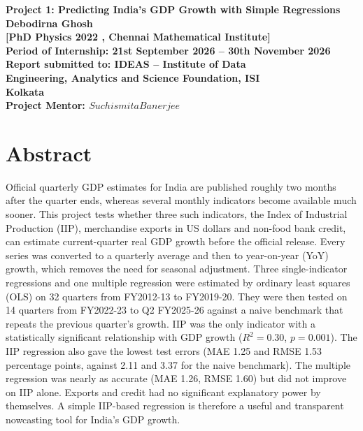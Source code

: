 \documentclass[11pt, a4paper]{article}
\begin{document}
\begin{titlepage}
    \centering
    \vspace*{1.5cm}
    
    
    {\LARGE \textbf{Project 1: Predicting India's GDP Growth with Simple Regressions}} \\[2.2cm]
    
    {\Large \textbf{Debodirna Ghosh}} \\[0.3cm]
    {\large \textbf{[PhD Physics 2022 , Chennai Mathematical Institute]}} \\[2cm]
    
    {\large \textbf{Period of Internship: 21st September 2026 -- 30th November 2026}} \\[2.2cm]
    
    {\Large \textbf{Report submitted to: IDEAS -- Institute of Data}} \\[0.2cm]
    {\Large \textbf{Engineering, Analytics and Science Foundation, ISI}} \\[0.2cm]
    {\Large \textbf{Kolkata}} \\[2.5cm]
    
    {\large \textbf{Project Mentor: $Suchismita Banerjee$}}
    
    \vfill
\end{titlepage}

\section{Abstract}
Official quarterly GDP estimates for India are published roughly two months after the quarter ends, whereas several monthly indicators become available much sooner. This project tests whether three such indicators, the Index of Industrial Production (IIP), merchandise exports in US dollars and non-food bank credit, can estimate current-quarter real GDP growth before the official release. Every series was converted to a quarterly average and then to year-on-year (YoY) growth, which removes the need for seasonal adjustment. Three single-indicator regressions and one multiple regression were estimated by ordinary least squares (OLS) on 32 quarters from FY2012-13 to FY2019-20. They were then tested on 14 quarters from FY2022-23 to Q2 FY2025-26 against a naive benchmark that repeats the previous quarter's growth. IIP was the only indicator with a statistically significant relationship with GDP growth ($R^2 = 0.30$, $p = 0.001$). The IIP regression also gave the lowest test errors (MAE 1.25 and RMSE 1.53 percentage points, against 2.11 and 3.37 for the naive benchmark). The multiple regression was nearly as accurate (MAE 1.26, RMSE 1.60) but did not improve on IIP alone. Exports and credit had no significant explanatory power by themselves. A simple IIP-based regression is therefore a useful and transparent nowcasting tool for India's GDP growth.
\end{document}
